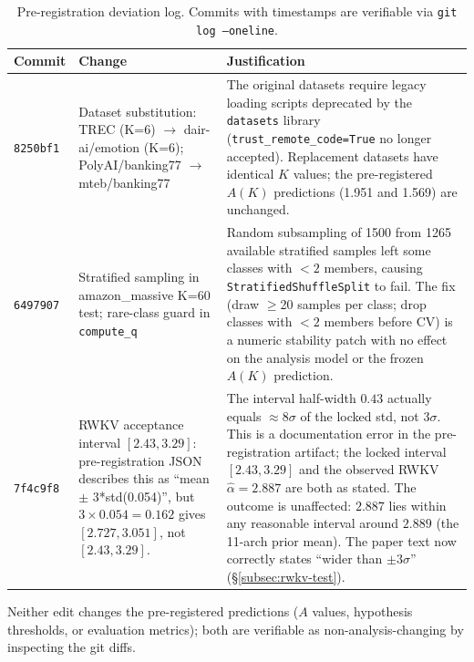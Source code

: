 \documentclass{article}
\begin{document}
\begin{table}[h]
\centering
\caption{Pre-registration deviation log. Commits with timestamps are verifiable via \texttt{git log --oneline}.}
\label{tab:prereg-deviations}
\small
\begin{tabular}{p{2.2cm}p{5.0cm}p{5.0cm}}
\toprule
Commit & Change & Justification \\
\midrule
\texttt{8250bf1} & Dataset substitution: TREC (K=6) $\to$ dair-ai/emotion (K=6); PolyAI/banking77 $\to$ mteb/banking77 &
The original datasets require legacy loading scripts deprecated by the \texttt{datasets} library (\texttt{trust\_remote\_code=True} no longer accepted). Replacement datasets have identical $K$ values; the pre-registered $A(K)$ predictions (1.951 and 1.569) are unchanged. \\
\addlinespace
\texttt{6497907} & Stratified sampling in amazon\_massive K=60 test; rare-class guard in \texttt{compute\_q} &
Random subsampling of 1500 from 1265 available stratified samples left some classes with $<2$ members, causing \texttt{StratifiedShuffleSplit} to fail. The fix (draw $\geq$20 samples per class; drop classes with $<2$ members before CV) is a numeric stability patch with no effect on the analysis model or the frozen $A(K)$ prediction. \\
\addlinespace
\texttt{7f4c9f8} & RWKV acceptance interval $[2.43, 3.29]$: pre-registration JSON describes this as ``mean $\pm$ 3*std(0.054)'', but $3\times0.054=0.162$ gives $[2.727, 3.051]$, not $[2.43, 3.29]$. &
The interval half-width $0.43$ actually equals $\approx8\sigma$ of the locked std, not $3\sigma$. This is a documentation error in the pre-registration artifact; the locked interval $[2.43, 3.29]$ and the observed RWKV $\hat\alpha=2.887$ are both as stated. The outcome is unaffected: $2.887$ lies within any reasonable interval around $2.889$ (the 11-arch prior mean). The paper text now correctly states ``wider than $\pm3\sigma$'' (\S\ref{subsec:rwkv-test}). \\
\bottomrule
\end{tabular}
\end{table}

Neither edit changes the pre-registered predictions ($A$ values, hypothesis thresholds, or evaluation metrics); both are verifiable as non-analysis-changing by inspecting the git diffs.
\end{document}

